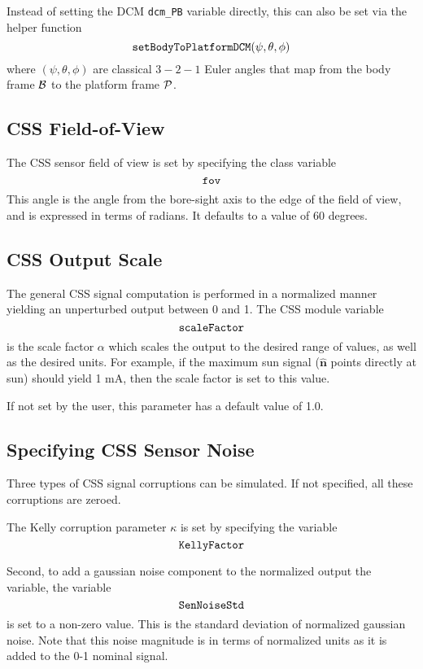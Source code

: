 Instead of setting the DCM {\tt dcm\_PB} variable directly, this can also be set via the helper function
$$
	{\tt setBodyToPlatformDCM}(\psi, \theta, \phi)
$$
where $(\psi, \theta, \phi)$ are classical $3-2-1$ Euler angles that map from the body frame $\cal B$ to the platform frame $\cal P$.  




\subsection{CSS Field-of-View}
The CSS sensor field of view is set by specifying the class variable
$$
	{\tt fov}
$$
This angle is the angle from the bore-sight axis to the edge of the field of view, and is expressed in terms of radians.  
It defaults to a value of 60 degrees.





\subsection{CSS Output Scale}
The general CSS signal computation is performed in a normalized manner yielding an unperturbed output between 0 and 1.  The CSS module variable
$$
	{\tt scaleFactor}
$$
is the scale factor $\alpha$ which scales the output to the desired range of values, as well as the desired units.  For example, if the maximum sun signal ($\hat{\bm n}$ points directly at sun) should yield 1 mA, then the scale factor is set to this value.    

If not set by the user, this parameter has a default value of 1.0.



\subsection{Specifying CSS Sensor Noise}
Three types of CSS signal corruptions can be simulated.  If not specified, all these corruptions are zeroed.  

The Kelly corruption parameter $\kappa$ is set by specifying the variable
$$
	{\tt KellyFactor}
$$

Second, to add a gaussian noise component to the normalized output the variable, the variable
$$
	{\tt SenNoiseStd}
$$
is set to a non-zero value.  This is the standard deviation of normalized gaussian noise.  Note that this noise magnitude is in terms of normalized units as it is added to the 0-1 nominal signal.  

